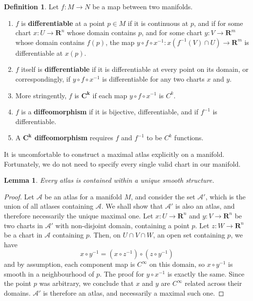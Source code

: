 \documentclass[12pt]{report}
\theoremstyle{plain}
\newtheorem{lemma}[theorem]{Lemma}
\theoremstyle{definition}
\newtheorem*{defi}{Definition}
\newenvironment{definition}
    {\begin{samepage}\begin{framed}\begin{defi}}
    {\end{defi}\end{framed}\end{samepage}}
\begin{document}
\begin{definition}
    Let $f:M \to N$ be a map between two manifolds.
    \begin{enumerate}
        \item $f$ is {\bf differentiable} at a point $p \in M$ if it is continuous at $p$, and if for some chart $x:U \to \mathbf{R}^n$ whose domain contains $p$, and for some chart $y:V \to \mathbf{R}^m$ whose domain contains $f(p)$, the map $y \circ f \circ x^{-1}:x(f^{-1}(V) \cap U) \to \mathbf{R}^m$ is differentiable at $x(p)$.
        \item $f$ itself is {\bf differentiable} if it is differentiable at every point on its domain, or correspondingly, if $y \circ f \circ x^{-1}$ is differentiable for any two charts $x$ and $y$.
        \item More stringently, $f$ is $\mathbf{C^k}$ if each map $y \circ f \circ x^{-1}$ is $C^k$.
        \item $f$ is a {\bf diffeomorphism} if it is bijective, differentiable, and if $f^{-1}$ is differentiable.
        \item A {\bf $\mathbf{C^k}$ diffeomorphism} requires $f$ and $f^{-1}$ to be $C^k$ functions.
    \end{enumerate}
\end{definition}

It is uncomfortable to construct a maximal atlas explicitly on a manifold. Fortunately, we do not need to specify every single valid chart in our manifold.

\begin{lemma}
    Every atlas is contained within a unique smooth structure.
\end{lemma}
\begin{proof}
Let $\mathcal{A}$ be an atlas for a manifold $M$, and consider the set $\mathcal{A}'$, which is the union of all atlases containing $\mathcal{A}$. We shall show that $\mathcal{A}'$ is also an atlas, and therefore necessarily the unique maximal one. Let $x:U \to \mathbf{R}^n$ and $y:V \to \mathbf{R}^n$ be two charts in $\mathcal{A}'$ with non-disjoint domain, containing a point $p$. Let $z:W \to \mathbf{R}^n$ be a chart in $\mathcal{A}$ containing $p$. Then, on $U \cap V \cap W$, an open set containing $p$, we have
%
\[ x \circ y^{-1} = (x \circ z^{-1}) \circ (z \circ y^{-1}) \]
%
and by assumption, each component map is $C^\infty$ on this domain, so $x \circ y^{-1}$ is smooth in a neighbourhood of $p$. The proof for $y \circ x^{-1}$ is exactly the same. Since the point $p$ was arbitrary, we conclude that $x$ and $y$ are $C^\infty$ related across their domains. $\mathcal{A}'$ is therefore an atlas, and necessarily a maximal such one.
\end{proof}
\end{document}
